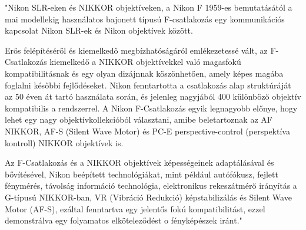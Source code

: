 
"Nikon SLR-eken és NIKKOR objektíveken, a Nikon F 1959-es bemutatásától a mai modellekig használatos bajonett típusú F-csatlakozás egy kommunikációs kapcsolat Nikon SLR-ek és Nikon objektívek között.

Erős felépítéséről és kiemelkedő megbízhatóságáról emlékezetessé vált, az F-Csatlakozás kiemelkedő a NIKKOR objektívekkel való magasfokú kompatibilitásnak és egy olyan dizájnnak köszönhetően, amely képes magába foglalni későbbi fejlődéseket. Nikon fenntartotta a csatlakozás alap struktúráját az 50 éven át tartó használata során, és jelenleg nagyjából 400 különböző objektív kompatibilis a rendszerrel. A Nikon F-Csatlakozás egyik legnagyobb előnye, hogy lehet egy nagy objektívkollekcióból választani, amibe beletartoznak az AF NIKKOR, AF-S (Silent Wave Motor) és PC-E perspective-control (perspektíva kontroll) NIKKOR objektívek is.

Az F-Csatlakozás és a NIKKOR objektívek képességeinek adaptálásával és bővítésével, Nikon beépített technológiákat, mint például autófókusz, fejlett fénymérés, távolság információ technológia, elektronikus rekeszátmérő irányítás a G-típusú NIKKOR-ban, VR (Vibráció Redukció) képstabilizálás és Silent Wave Motor (AF-S), ezáltal fenntartva egy jelentős fokú kompatibilitást, ezzel demonstrálva egy folyamatos elköteleződést o fényképészek iránt."\cite{Nikon_F_mount-ról}





